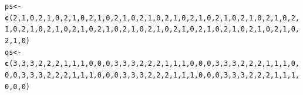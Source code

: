 \documentclass{article}\usepackage[]{graphicx}\usepackage[]{color}
\makeatletter
\newcommand{\hlnum}[1]{\textcolor[rgb]{0.686,0.059,0.569}{#1}}%
\newcommand{\hlstd}[1]{\textcolor[rgb]{0.345,0.345,0.345}{#1}}%
\newcommand{\hlkwb}[1]{\textcolor[rgb]{0.69,0.353,0.396}{#1}}%
\newcommand{\hlkwd}[1]{\textcolor[rgb]{0.737,0.353,0.396}{\textbf{#1}}}%
\newenvironment{kframe}{%
 \def\at@end@of@kframe{}%
 \ifinner\ifhmode%
  \def\at@end@of@kframe{\end{minipage}}%
  \begin{minipage}{\columnwidth}%
 \fi\fi%
 \def\FrameCommand##1{\hskip\@totalleftmargin \hskip-\fboxsep
 \colorbox{shadecolor}{##1}\hskip-\fboxsep
     \hskip-\linewidth \hskip-\@totalleftmargin \hskip\columnwidth}%
 \MakeFramed {\advance\hsize-\width
   \@totalleftmargin\z@ \linewidth\hsize
   \@setminipage}}%
 {\par\unskip\endMakeFramed%
 \at@end@of@kframe}
\newenvironment{knitrout}{}{} %
\makeatother
\begin{document}
\begin{knitrout}
\color{fgcolor}\begin{kframe}
\begin{alltt}
\hlstd{ps} \hlkwb{<-} \hlkwd{c}\hlstd{(}\hlnum{2}\hlstd{,}\hlnum{1}\hlstd{,}\hlnum{0}\hlstd{,}\hlnum{2}\hlstd{,}\hlnum{1}\hlstd{,}\hlnum{0}\hlstd{,}\hlnum{2}\hlstd{,}\hlnum{1}\hlstd{,}\hlnum{0}\hlstd{,}\hlnum{2}\hlstd{,}\hlnum{1}\hlstd{,}\hlnum{0}\hlstd{,}\hlnum{2}\hlstd{,}\hlnum{1}\hlstd{,}\hlnum{0}\hlstd{,}\hlnum{2}\hlstd{,}\hlnum{1}\hlstd{,}\hlnum{0}\hlstd{,}\hlnum{2}\hlstd{,}\hlnum{1}\hlstd{,}\hlnum{0}\hlstd{,}\hlnum{2}\hlstd{,}\hlnum{1}\hlstd{,}\hlnum{0}\hlstd{,}\hlnum{2}\hlstd{,}\hlnum{1}\hlstd{,}\hlnum{0}\hlstd{,}\hlnum{2}\hlstd{,}\hlnum{1}\hlstd{,}\hlnum{0}\hlstd{,}\hlnum{2}\hlstd{,}\hlnum{1}\hlstd{,}\hlnum{0}\hlstd{,}\hlnum{2}\hlstd{,}\hlnum{1}\hlstd{,}\hlnum{0}\hlstd{,}\hlnum{2}\hlstd{,}\hlnum{1}\hlstd{,}\hlnum{0}\hlstd{,}\hlnum{2}\hlstd{,}\hlnum{1}\hlstd{,}\hlnum{0}\hlstd{,}\hlnum{2}\hlstd{,}\hlnum{1}\hlstd{,}\hlnum{0}\hlstd{,}\hlnum{2}\hlstd{,}\hlnum{1}\hlstd{,}\hlnum{0}\hlstd{,}\hlnum{2}\hlstd{,}\hlnum{1}\hlstd{,}\hlnum{0}\hlstd{,}\hlnum{2}\hlstd{,}\hlnum{1}\hlstd{,}\hlnum{0}\hlstd{,}\hlnum{2}\hlstd{,}\hlnum{1}\hlstd{,}\hlnum{0}\hlstd{,}\hlnum{2}\hlstd{,}\hlnum{1}\hlstd{,}\hlnum{0}\hlstd{,}\hlnum{2}\hlstd{,}\hlnum{1}\hlstd{,}\hlnum{0}\hlstd{,}\hlnum{2}\hlstd{,}\hlnum{1}\hlstd{,}\hlnum{0}\hlstd{,}\hlnum{2}\hlstd{,}\hlnum{1}\hlstd{,}\hlnum{0}\hlstd{,}\hlnum{2}\hlstd{,}\hlnum{1}\hlstd{,}\hlnum{0}\hlstd{)}
\hlstd{qs} \hlkwb{<-} \hlkwd{c}\hlstd{(}\hlnum{3}\hlstd{,}\hlnum{3}\hlstd{,}\hlnum{3}\hlstd{,}\hlnum{2}\hlstd{,}\hlnum{2}\hlstd{,}\hlnum{2}\hlstd{,}\hlnum{1}\hlstd{,}\hlnum{1}\hlstd{,}\hlnum{1}\hlstd{,}\hlnum{0}\hlstd{,}\hlnum{0}\hlstd{,}\hlnum{0}\hlstd{,}\hlnum{3}\hlstd{,}\hlnum{3}\hlstd{,}\hlnum{3}\hlstd{,}\hlnum{2}\hlstd{,}\hlnum{2}\hlstd{,}\hlnum{2}\hlstd{,}\hlnum{1}\hlstd{,}\hlnum{1}\hlstd{,}\hlnum{1}\hlstd{,}\hlnum{0}\hlstd{,}\hlnum{0}\hlstd{,}\hlnum{0}\hlstd{,}\hlnum{3}\hlstd{,}\hlnum{3}\hlstd{,}\hlnum{3}\hlstd{,}\hlnum{2}\hlstd{,}\hlnum{2}\hlstd{,}\hlnum{2}\hlstd{,}\hlnum{1}\hlstd{,}\hlnum{1}\hlstd{,}\hlnum{1}\hlstd{,}\hlnum{0}\hlstd{,}\hlnum{0}\hlstd{,}\hlnum{0}\hlstd{,}\hlnum{3}\hlstd{,}\hlnum{3}\hlstd{,}\hlnum{3}\hlstd{,}\hlnum{2}\hlstd{,}\hlnum{2}\hlstd{,}\hlnum{2}\hlstd{,}\hlnum{1}\hlstd{,}\hlnum{1}\hlstd{,}\hlnum{1}\hlstd{,}\hlnum{0}\hlstd{,}\hlnum{0}\hlstd{,}\hlnum{0}\hlstd{,}\hlnum{3}\hlstd{,}\hlnum{3}\hlstd{,}\hlnum{3}\hlstd{,}\hlnum{2}\hlstd{,}\hlnum{2}\hlstd{,}\hlnum{2}\hlstd{,}\hlnum{1}\hlstd{,}\hlnum{1}\hlstd{,}\hlnum{1}\hlstd{,}\hlnum{0}\hlstd{,}\hlnum{0}\hlstd{,}\hlnum{0}\hlstd{,}\hlnum{3}\hlstd{,}\hlnum{3}\hlstd{,}\hlnum{3}\hlstd{,}\hlnum{2}\hlstd{,}\hlnum{2}\hlstd{,}\hlnum{2}\hlstd{,}\hlnum{1}\hlstd{,}\hlnum{1}\hlstd{,}\hlnum{1}\hlstd{,}\hlnum{0}\hlstd{,}\hlnum{0}\hlstd{,}\hlnum{0}\hlstd{)}

\end{alltt}
\end{kframe}
\end{knitrout}
\end{document}
